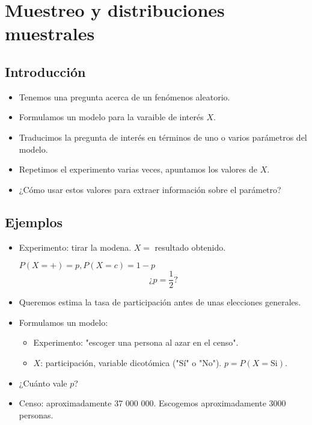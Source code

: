 \section{Muestreo y distribuciones muestrales}
\subsection{Introducción}
\begin{tcolorbox}[colback=blue!5!white, colframe=blue!75!black, title=El contexto]
\begin{itemize}[label=\textbullet]
    \item Tenemos una pregunta acerca de un fenómenos aleatorio.
    \item Formulamos un modelo para la varaible de interés $X$.
    \item Traducimos la pregunta de interés en términos de uno o varios parámetros del modelo.
    \item Repetimos el experimento varias veces, apuntamos los valores de  $X$.
    \item ¿Cómo usar estos valores para extraer información sobre el parámetro?
\end{itemize}
\end{tcolorbox}

\subsection{Ejemplos}

\begin{tcolorbox}[colback=blue!5!white, colframe=blue!75!black, title=¿Está la moneda trucada?]
\begin{itemize}[label=\textbullet]
    \item Experimento: tirar la modena. $X=$ resultado obtenido.

         $P(X=+)=p,P(X=c)=1-p$  \[
         \text{¿} p = \dfrac{1}{2}?
         \] 
\end{itemize}
\end{tcolorbox}

\begin{tcolorbox}[colback=blue!5!white, colframe=blue!75!black, title=Sondeo sobre intención de participación en unas elecciones]
\begin{itemize}[label=\textbullet]
    \item Queremos estima la tasa de participación antes de unas elecciones generales.
    \item Formulamos un modelo:
        \begin{itemize}[label=\textrightarrow]
            \item Experimento: "escoger una persona al azar en el censo".
            \item $X$: participación, variable dicotómica ("Sí" o "No").  $p=P(X=\text{Si})$.
        \end{itemize}
    \item ¿Cuánto vale $p$?
    \item Censo: aproximadamente 37 000 000. Escogemos aproximadamente 3000 personas.
\end{itemize}
\end{tcolorbox}

